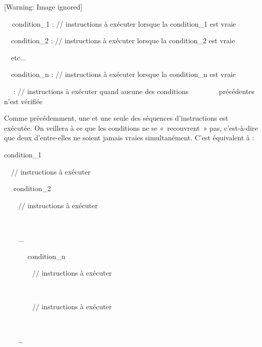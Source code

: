 \begin{center}
 [Warning: Image ignored] %

\end{center}
{\sffamily
\textbf{\ \ }condition\_1 : // instructions à exécuter lorsque la
condition\_1 est vraie}

{\sffamily
\ \ condition\_2 : // instructions à exécuter lorsque la condition\_2
est vraie}

{\sffamily
\ \ etc...}

{\sffamily
\ \ condition\_n : // instructions à exécuter lorsque la condition\_n
est vraie}


\bigskip

{\sffamily
\ \  : // instructions à exécuter quand aucune
des conditions \ \ \ \ \ \ \ \ précédentes n’est vérifiée}

{\sffamily
{}\textbf{ }}

{
Comme précédemment, une et une seule des séquences d’instructions est
exécutée. On veillera à ce que les conditions ne se «~recouvrent~» pas,
c’est-à-dire que deux d’entre-elles ne soient jamais vraies
simultanément. C'est équivalent à :}

{\sffamily
{} condition\_1 }

{\sffamily
\ \ // instructions à exécuter}

{\sffamily
{}}

{\sffamily
\ \  condition\_2 }

{\sffamily
\ \ \ \ // instructions à exécuter}

{\sffamily
\ \ }

{\sffamily
\ \ \ \ ...}

{\sffamily
\ \ \ \ \ \  condition\_n }

{\sffamily
\ \ \ \ \ \ \ \ // instructions à exécuter}

{\sffamily
\ \ \ \ \ \ }

{\sffamily
\ \ \ \ \ \ \ \ // instructions à exécuter}

{\sffamily
\ \ \ \ \ \ }

{\sffamily
\ \ \ \ …}

{\sffamily
\ \ }

